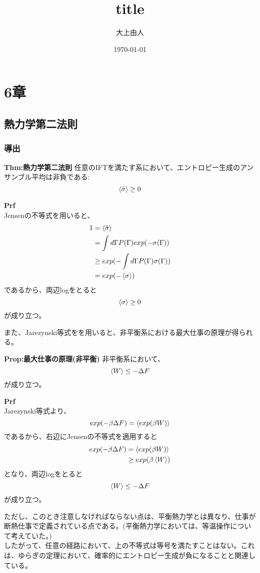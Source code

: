\documentclass[a4paper,11pt]{jsarticle}
\begin{document}
\title{title}
\author{大上由人}
\date{\today}
\maketitle
\section*{6章}
\subsection[6.1]{熱力学第二法則}
\subsubsection[6.1.1]{導出}
\begin{itembox}[l]{\textbf{Thm:熱力学第二法則}}
    任意のIFTを満たす系において、エントロピー生成のアンサンブル平均は非負である:
    \begin{equation}
        \ev{\hat{\sigma}} \geq 0
    \end{equation}

\end{itembox}
\textbf{Prf}\\
Jensenの不等式を用いると、
\begin{align}
    1 &= \ev{\hat{\sigma}}\\
    &= \int d\Gamma P(\Gamma) exp(-\sigma(\Gamma))\\
    &\geq exp(-\int d\Gamma P(\Gamma)\sigma(\Gamma))\\
    &= exp(-\ev{\sigma})
\end{align}
であるから、両辺logをとると
\begin{equation}
    \ev{\sigma} \geq 0
\end{equation}
が成り立つ。\qedsymbol

また、Jarezynski等式をを用いると、非平衡系における最大仕事の原理が得られる。
\begin{itembox}[l]{\textbf{Prop:最大仕事の原理(非平衡)}}
    非平衡系において、
    \begin{equation}
        \ev{W} \leq -\Delta F
    \end{equation}
    が成り立つ。
\end{itembox}
\textbf{Prf}\\
Jarezynski等式より、
\begin{equation}
    exp(-\beta \Delta F) = \ev{exp(\beta W)}
\end{equation}
であるから、右辺にJensenの不等式を適用すると
\begin{align}
    exp(-\beta \Delta F) &= \ev{exp(\beta W)}\\
    &\geq exp(\beta \ev{W})
\end{align}
となり、両辺logをとると
\begin{equation}
    \ev{W} \leq -\Delta F
\end{equation}
が成り立つ。\qedsymbol

ただし、このとき注意しなければならない点は、平衡熱力学とは異なり、仕事が断熱仕事で定義されている点である。(平衡熱力学においては、等温操作について考えていた。)\\
したがって、任意の経路において、上の不等式は等号を満たすことはない。これは、ゆらぎの定理において、確率的にエントロピー生成が負になることと関連している。\\
\end{document}
